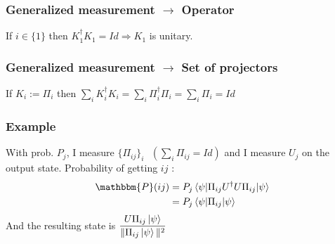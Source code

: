 \documentclass{article}
\begin{document}
\subsubsection*{Generalized measurement $\rightarrow$ Operator}
If $i \in \{1\}$ then
$K_1^\dagger K_1=Id \Rightarrow K_1$ is unitary.%

\subsubsection*{Generalized measurement $\rightarrow$ Set of projectors}
If $K_i := \Pi_i$ then $\sum_i K_i^\dagger K_i = \sum_i \Pi_i^\dagger\Pi_i = \sum_i \Pi_i = Id$

\subsubsection*{Example}
With prob. $P_j$, I measure $\{\Pi_{ij}\}_i \text{ } (\sum_i \Pi_{ij} = Id)$ and I measure $U_j$ on the output state.
Probability of getting $ij$ :
\begin{equation}
    \begin{aligned}
        \mathbbm{P}(ij)
            &= P_j\braket{\psi | \Pi_{ij} U^\dagger U \Pi_{ij} | \psi} \\
            &= P_j\braket{\psi|\Pi_{ij}|\psi}
    \end{aligned}
\end{equation}
\noindent
And the resulting state is $\dfrac{U\Pi_{ij}\ket{\psi}}{\|\Pi_{ij}\ket{\psi}\|^2}$
\end{document}
